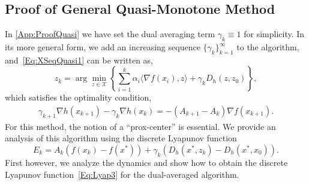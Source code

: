 \documentclass[11pt]{article}
\theoremstyle{plain}
\newcommand{\X}{{\mathcal X}}
\begin{document}
\subsection{Proof of General Quasi-Monotone Method}
\label{App:ProofQuasiGen}
In \ref{App:ProofQuasi} we have set  the dual averaging term $\gamma_k \equiv 1$  for simplicity.
In its more general form, we add an increasing sequence $\{\gamma_k\}_{k=1}^\infty$ to the algorithm, and~\eqref{Eq:XSeqQuasi1} can be written as, 
\begin{equation*}
z_k = \arg \min_{z\in \X} \left\{ \sum_{i=1}^k \alpha_i \langle \nabla f(x_i), z\rangle + \gamma_kD_h(z, z_0)\right\} \label{Eq:XSeqQuasi2},
\end{equation*}
which satisfies the optimality condition,
\begin{align}\label{Eq:DualAvgX}
\gamma_{k+1} \nabla h(x_{k+1})  - \gamma_k \nabla h(x_k)  =-(A_{k+1} - A_{k}) \nabla f(x_{k+1}).
\end{align}
For this method, the notion of a ``prox-center'' is essential. We provide an analysis of  this algorithm using the discrete Lyapunov function 
\begin{equation}\label{Eq:Lyap3}
E_k = A_k(f(x_k) - f(x^\ast)) + \gamma_k (D_h(x^\ast, z_k) -D_h(x^\ast, x_0)).
\end{equation}
First however, we analyze the dynamics and show how to obtain the discrete Lyapunov function~\eqref{Eq:Lyap3} for the dual-averaged algorithm.
 
\end{document}

